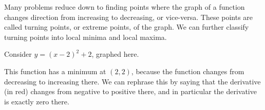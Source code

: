 



Many problems reduce down to finding points where the graph of a function changes direction from increasing
to decreasing, or vice-versa. These points are called turning points, or extreme points, of the graph. We can further classify
turning points into local minima and local maxima.

\begin{ex}
  Consider $ y = (x - 2)^2 + 2 $, graphed here.
  \begin{center}
  \end{center}
  This function has a minimum at $ (2,2) $, because the function changes from decreasing to increasing there.
  We can rephrase this by saying that the derivative (in red) changes from negative to positive there, and in particular
  the derivative is exactly zero there.
  \begin{center}
  \end{center}
\end{ex}

